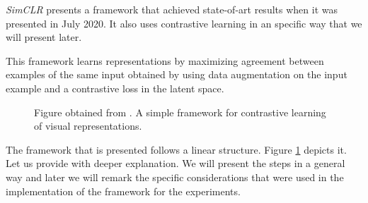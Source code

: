 \emph{SimCLR} \citep{chen_simple_2020} presents a framework that achieved state-of-art results when it was presented in July 2020. It also uses contrastive learning in an specific way that we will present later. 

This framework learns representations by maximizing agreement between examples of the same input obtained by using data augmentation on the input example and a contrastive loss in the latent space. 


\begin{figure}[H]
    \small
        \centering
        \caption{Figure obtained from \cite{chen_simple_2020}. A simple framework for contrastive learning of visual representations.}
        \label{fig:framework:SimCLR}
    \end{figure}


The framework that is presented follows a linear structure. Figure \ref{fig:framework:SimCLR} depicts it. Let us provide with deeper explanation. We will present the steps in a general way and later we will remark the specific considerations that were used in the implementation of the framework for the experiments. 

